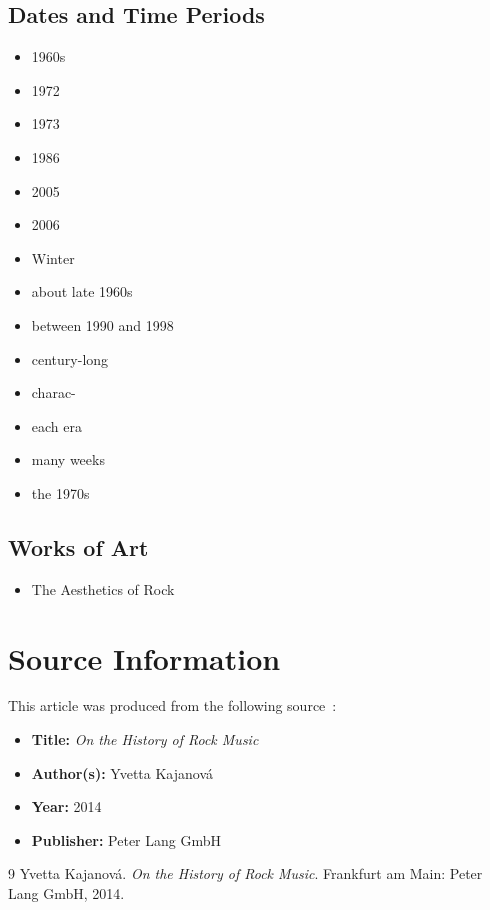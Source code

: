 \documentclass[12pt,a4paper]{article}
\begin{document}
\subsection{Dates and Time Periods}
\begin{itemize}
  \item 1960s
  \item 1972
  \item 1973
  \item 1986
  \item 2005
  \item 2006
  \item Winter
  \item about late 1960s
  \item between 1990 and 1998
  \item century-long
  \item charac-
  \item each era
  \item many weeks
  \item the 1970s
\end{itemize}

\subsection{Works of Art}
\begin{itemize}
  \item The Aesthetics of Rock
\end{itemize}


\section{Source Information}

This article was produced from the following
source~\cite{kajanova2014}:

\begin{itemize}
  \item \textbf{Title:} \textit{On the History of Rock Music}
  \item \textbf{Author(s):} Yvetta Kajanov\'a
  \item \textbf{Year:} 2014
  \item \textbf{Publisher:} Peter Lang GmbH
\end{itemize}

\begin{thebibliography}{9}
Yvetta Kajanov\'a.
\textit{On the History of Rock Music}.
Frankfurt am Main: Peter Lang GmbH, 2014.
\end{thebibliography}
\end{document}
